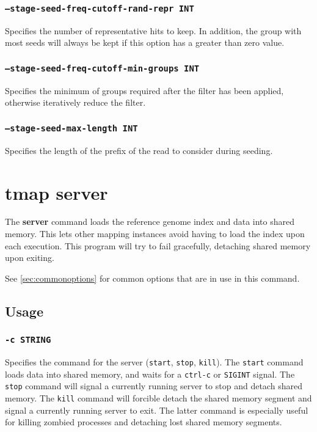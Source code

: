 \documentclass[a4paper,12pt]{book}
\newcommand{\TT}[1]{{\tt #1}} %
\newcommand{\BF}[1]{{\bf #1}} %
\begin{document}
\subsubsection{\TT{--stage-seed-freq-cutoff-rand-repr INT}}
Specifies the number of representative hits to keep.
In addition, the group with most seeds will always be kept if this option has a greater than zero value.

\subsubsection{\TT{--stage-seed-freq-cutoff-min-groups INT}}
Specifies the minimum of groups required after the filter has been applied, otherwise iteratively reduce the filter.

\subsubsection{\TT{--stage-seed-max-length INT}}
Specifies the length of the prefix of the read to consider during seeding.

\section{tmap server}
\label{sec:server}
The \BF{server} command loads the reference genome index and data into shared memory.
This lets other mapping instances avoid having to load the index upon each execution.
This program will try to fail gracefully, detaching shared memory upon exiting.

See \autoref{sec:commonoptions} for common options that are in use in this command.
\subsection{Usage}

\subsubsection{\TT{-c STRING}}
Specifies the command for the server (\TT{start}, \TT{stop}, \TT{kill}).
The \TT{start} command loads data into shared memory, and waits for a \TT{ctrl-c} or \TT{SIGINT} signal.
The \TT{stop} command will signal a currently running server to stop and detach shared memory.
The \TT{kill} command will forcible detach the shared memory segment and signal a currently running server to exit.
The latter command is especially useful for killing zombied processes and detaching lost shared memory segments.
\end{document}
